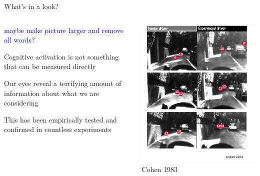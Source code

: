 \documentclass{beamer}
\providecommand{\cn}[1]{\textcolor{blue}{#1}}
\begin{document}
\begin{frame}{What's in a look?}

\begin{columns}
\begin{column}{0.45\textwidth}

\cn{maybe make picture larger and remove all words?}

Cognitive activation is not something that can be measured directly \vspace{4mm}

Our eyes reveal a terrifying amount of information about what we are considering \vspace{4mm}

This has been empirically tested and confirmed in countless experiments
\end{column}
\begin{column}{0.5\textwidth}
\begin{center}
\includegraphics[scale=0.95]{img/edit_car_eye.pdf}
{\tiny Cohen 1983}
\end{center}
\end{column}
\end{columns}

\end{frame}
\end{document}
